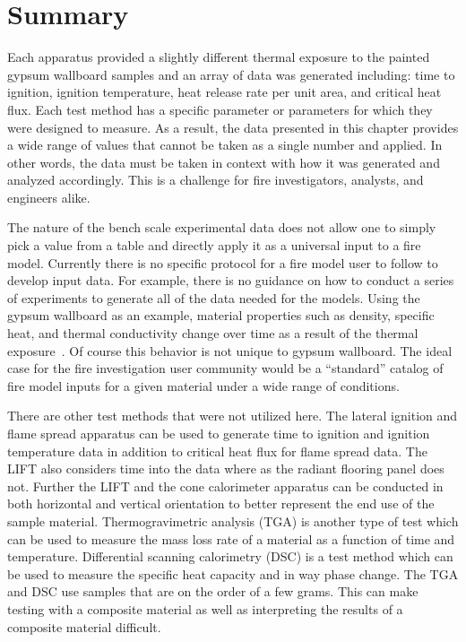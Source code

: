 \documentclass[twoside]{uocthesis}
\begin{document}
{\section{Summary}

Each apparatus provided a slightly different thermal exposure to the painted gypsum wallboard samples and an array of data was generated including: time to ignition, ignition temperature, heat release rate per unit area, and critical heat flux.  Each test method has a specific parameter or parameters for which they were designed to measure. As a result, the data presented in this chapter provides a wide range of values that cannot be taken as a single number and applied.  In other words, the data must be taken in context with how it was generated and analyzed accordingly. This is a challenge for fire investigators, analysts, and engineers alike.  

The nature of the bench scale experimental data does not allow one to simply pick a value from a table and directly apply it as a universal input to a fire model.   Currently there is no specific protocol for a fire model user to follow to develop input data.  For example, there is no guidance on how to conduct a series of experiments to generate all of the data needed for the models.  Using the gypsum wallboard as an example, material properties such as density, specific heat, and thermal conductivity change over time as a result of the thermal exposure~\cite{Schroeder:1999,McGraw:1999}.  Of course this behavior is not unique to gypsum wallboard. The ideal case for the fire investigation user community would be a ``standard'' catalog of fire model inputs for a given material under a wide range of conditions.

There are other test methods that were not utilized here.  The lateral ignition and flame spread apparatus can be used to generate time to ignition and ignition temperature data in addition to critical heat flux for flame spread data.  The LIFT also considers time into the data where as the radiant flooring panel does not.  Further the LIFT and the cone calorimeter apparatus can be conducted in both horizontal and vertical orientation to better represent the end use of the sample material.  Thermogravimetric analysis (TGA) is another type of test which can be used to measure the mass loss rate of a material as a function of time and temperature.  Differential scanning calorimetry (DSC) is a test method which can be used to measure the specific heat capacity and in way phase change.  The TGA and DSC use samples that are on the order of a few grams.  This can make testing with a composite material as well as interpreting the results of a composite material difficult.   

}
\end{document}
